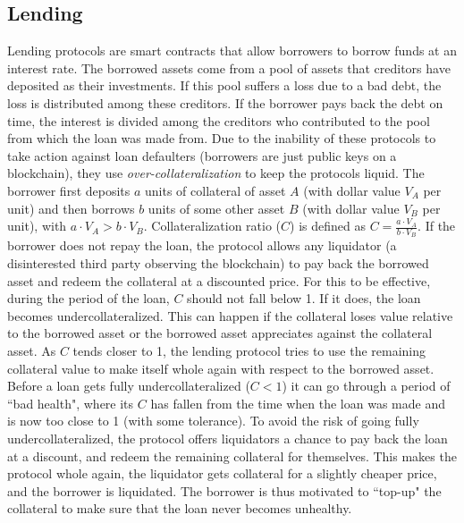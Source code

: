 \subsection{Lending}
Lending protocols are smart contracts that allow borrowers to borrow funds at an interest rate. The borrowed assets come from a pool of assets that creditors have deposited as their investments. If this pool suffers a loss due to a bad debt, the loss is distributed among these creditors. If the borrower pays back the debt on time, the interest is divided among the creditors who contributed to the pool from which the loan was made from. Due to the inability of these protocols to take action against loan defaulters (borrowers are just public keys on a blockchain), they use \textit{over-collateralization} to keep the protocols liquid. The borrower first deposits $a$ units of collateral of asset $A$ (with dollar value $V_A$ per unit) and then borrows $b$ units of some other asset $B$ (with dollar value $V_B$ per unit), with $a\cdot V_A > b\cdot V_B$. Collateralization ratio ($C$) is defined as $C = \frac{a\cdot V_A}{b\cdot V_B}$. If the borrower does not repay the loan, the protocol allows any liquidator (a disinterested third party observing the blockchain) to pay back the borrowed asset and redeem the collateral at a discounted price. For this to be effective, during the period of the loan, $C$ should not fall below 1. If it does, the loan becomes undercollateralized. This can happen if the collateral loses value relative to the borrowed asset or the borrowed asset appreciates against the collateral asset. As $C$ tends closer to 1, the lending protocol tries to use the remaining collateral value to make itself whole again with respect to the borrowed asset. Before a loan gets fully undercollateralized ($C < 1$) it can go through a period of ``bad health", where its $C$ has fallen from the time when the loan was made and is now too close to 1 (with some tolerance). To avoid the risk of going fully undercollateralized, the protocol offers liquidators a chance to pay back the loan at a discount, and redeem the remaining collateral for themselves. This makes the protocol whole again, the liquidator gets collateral for a slightly cheaper price, and the borrower is liquidated. The borrower is thus motivated to ``top-up" the collateral to make sure that the loan never becomes unhealthy.

